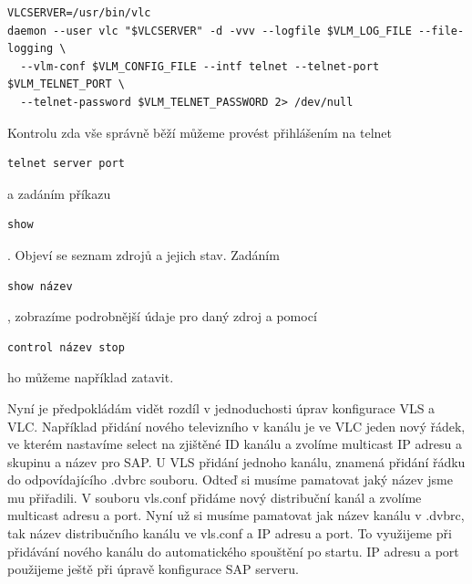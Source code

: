 \vspace{10pt}

\begin{small}
\begin{verbatim}
VLCSERVER=/usr/bin/vlc
daemon --user vlc "$VLCSERVER" -d -vvv --logfile $VLM_LOG_FILE --file-logging \
  --vlm-conf $VLM_CONFIG_FILE --intf telnet --telnet-port $VLM_TELNET_PORT \
  --telnet-password $VLM_TELNET_PASSWORD 2> /dev/null
\end{verbatim}
\end{small}

\vspace{10pt}

Kontrolu zda vše správně běží můžeme provést přihlášením na telnet \begin{small}\begin{verbatim}telnet server port\end{verbatim}\end{small} a zadáním příkazu \begin{small}\begin{verbatim}show\end{verbatim}\end{small}. Objeví se seznam zdrojů a jejich stav. Zadáním \begin{small}\begin{verbatim}show název\end{verbatim}\end{small}, zobrazíme podrobnější údaje pro daný zdroj a pomocí \begin{small}\begin{verbatim}control název stop\end{verbatim}\end{small} ho můžeme například zatavit.

\vspace{10pt}

Nyní je předpokládám vidět rozdíl v jednoduchosti úprav konfigurace VLS a VLC. Například přidání nového televizního v kanálu je ve VLC jeden nový řádek, ve kterém nastavíme select na zjištěné ID kanálu a zvolíme multicast IP adresu a skupinu a název pro SAP. U VLS přidání jednoho kanálu, znamená přidání řádku do odpovídajícího .dvbrc souboru. Odteď si musíme pamatovat jaký název jsme mu přiřadili. V souboru vls.conf přidáme nový distribuční kanál a zvolíme multicast adresu a port. Nyní už si musíme pamatovat jak název kanálu v .dvbrc, tak název distribučního kanálu ve vls.conf a IP adresu a port. To využijeme při přidávání nového kanálu do automatického spouštění po startu. IP adresu a port použijeme ještě při úpravě konfigurace SAP serveru.

